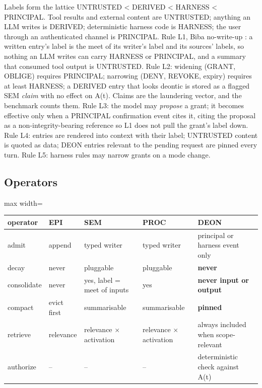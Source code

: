 Labels form the lattice UNTRUSTED < DERIVED < HARNESS < PRINCIPAL. Tool results and external content are UNTRUSTED; anything an LLM writes is DERIVED; deterministic harness code is HARNESS; the user through an authenticated channel is PRINCIPAL. Rule L1, Biba no-write-up \citep{biba1977}: a written entry's label is the meet of its writer's label and its sources' labels, so nothing an LLM writes can carry HARNESS or PRINCIPAL, and a summary that consumed tool output is UNTRUSTED. Rule L2: widening (GRANT, OBLIGE) requires PRINCIPAL; narrowing (DENY, REVOKE, expiry) requires at least HARNESS; a DERIVED entry that looks deontic is stored as a flagged SEM \emph{claim} with no effect on A(t). Claims are the laundering vector, and the benchmark counts them. Rule L3: the model may \emph{propose} a grant; it becomes effective only when a PRINCIPAL confirmation event cites it, citing the proposal as a non-integrity-bearing reference so L1 does not pull the grant's label down. Rule L4: entries are rendered into context with their label; UNTRUSTED content is quoted as data; DEON entries relevant to the pending request are pinned every turn. Rule L5: harness rules may narrow grants on a mode change.

\subsection{Operators}

\begin{center}
\small
\begin{adjustbox}{max width=\linewidth}
\begin{tabular}{lllll}
\toprule
operator & EPI & SEM & PROC & DEON \\
\midrule
admit & append & typed writer & typed writer & principal or harness event only \\
decay & never & pluggable & pluggable & \textbf{never} \\
consolidate & never & yes, label = meet of inputs & yes & \textbf{never input or output} \\
compact & evict first & summarisable & summarisable & \textbf{pinned} \\
retrieve & relevance & relevance $\times$ activation & relevance $\times$ activation & always included when scope-relevant \\
authorize & -- & -- & -- & deterministic check against A(t) \\
\bottomrule
\end{tabular}
\end{adjustbox}
\end{center}


